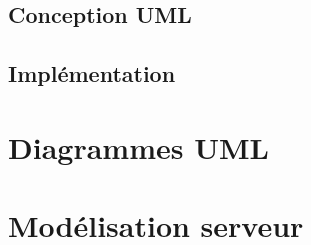 \documentclass[]{report}
\begin{document}
\chapter{Conception UML}

\chapter{Implémentation}

\part{Diagrammes UML}

\part{Modélisation serveur}
\end{document}
